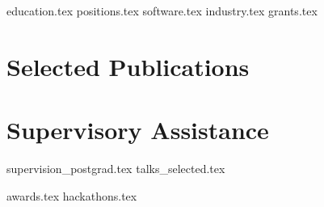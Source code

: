 \documentclass[a4paper,11pt]{article}
\begin{document}


{education.tex}
{positions.tex}
{software.tex}
{industry.tex}
{grants.tex}

\pagebreak

\section{Selected Publications}\label{publications}
\printbibliography[heading=none]

\begin{minipage}[t]{0.47\textwidth}
\section{Supervisory Assistance}
{{supervision_postgrad.tex}}
{{talks_selected.tex}}
\end{minipage} \hspace{0.04\textwidth} \begin{minipage}[t]{0.46\textwidth}
{{awards.tex}}
{{hackathons.tex}}
\end{minipage}
\end{document}
